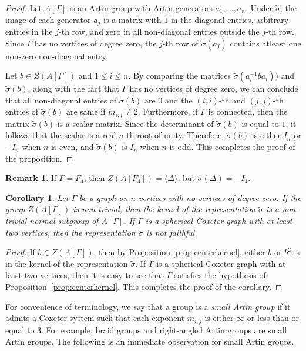 \documentclass[12pt]{amsart}
\newtheorem{corollary}[equation]{Corollary}
\theoremstyle{definition}
\newtheorem{remark}[equation]{Remark}
\numberwithin{equation}{section}
\begin{document}
\begin{proof}
Let $A[\Gamma]$ is an Artin group with Artin generators $a_1,\ldots, a_n$.  Under $\tilde{\sigma} $, the image of each generator $a_j$  is a matrix with $1$ in the diagonal entries, arbitrary entries in the $j$-th row, and zero in all non-diagonal entries outside the $j$-th row. Since $\Gamma$ has no vertices of degree zero, the $j$-th row of $\tilde{\sigma}(a_j)$ contains atleast one non-zero non-diagonal entry.

 Let $b \in Z(A[\Gamma])$ and $1\leq i\leq n$.  By comparing the matrices $\tilde{\sigma}(a_i^{-1}b a_i))$ and $\tilde{\sigma}(b)$, along with the fact that $\Gamma$ has no vertices of degree zero, we can conclude that all non-diagonal entries of $\tilde{\sigma}(b)$ are $0$ and the $(i,i)$-th and $(j,j)$-th entries of $\tilde{\sigma}(b)$ are same if $m_{i,j}\neq2$.  Furthermore, if $\Gamma$ is connected, then the matrix $\tilde{\sigma}(b)$ is a scalar matrix. Since the determinant of $\tilde{\sigma}(b)$ is equal to $1$, it follows that the scalar is a real $n$-th root of unity. Therefore, $\tilde{\sigma}(b)$ is either $I_n$ or $-I_n$ when $n$ is even, and $\tilde{\sigma}(b)$ is $I_n$ when $n$ is odd. This completes the proof of the proposition.
  \end{proof}

\begin{remark}
If $\Gamma =F_4$, then $Z(A[F_4])=\langle \Delta \rangle$, but $\tilde{\sigma}(\Delta)=-I_4$.
\end{remark}
\begin{corollary}\label{cor:kerspherical}
Let $\Gamma$ be a graph on $n$ vertices with no vertices of degree zero. If the group $Z(A[\Gamma])$ is non-trivial, then the kernel of the representation $\tilde{\sigma}$ is a non-trivial normal subgroup of $A[\Gamma]$. If $\Gamma$ is a spherical Coxeter graph with at least two vertices, then the representation $\tilde{\sigma}$ is not faithful.
\end{corollary}
\begin{proof}
If $b\in Z(A[\Gamma])$, then by Proposition \ref{prop:centerkernel}, either $b$ or $b^2$ is in the kernel of the representation $\tilde{\sigma}$. If $\Gamma$ is a spherical Coxeter graph with at least two vertices, then it is easy to see that $\Gamma$ satisfies the hypothesis of Proposition~\ref{prop:centerkernel}. This completes the proof of the corollary.
\end{proof}
For convenience of terminology, we say that a group is a {\it small Artin group} if it admits a Coxeter system such that each exponent $m_{i, j}$ is either $\infty$ or less than or equal to 3. For example, braid groups and right-angled Artin groups are small Artin groups.  The following is an immediate observation for small Artin groups.
\end{document}
